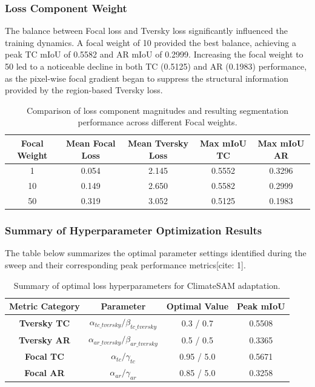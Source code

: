 \subsubsection{Loss Component Weight}
The balance between Focal loss and Tversky loss significantly influenced the training dynamics. A focal weight of 10 provided the best balance, achieving a peak TC mIoU of 0.5582 and AR mIoU of 0.2999. Increasing the focal weight to 50 led to a noticeable decline in both TC (0.5125) and AR (0.1983) performance, as the pixel-wise focal gradient began to suppress the structural information provided by the region-based Tversky loss.

\begin{table}[h]
\centering
\begin{tabular}{@{}ccccc@{}}
\toprule
Focal Weight & Mean Focal Loss & Mean Tversky Loss & Max mIoU TC & Max mIoU AR \\ \midrule
1 & 0.054 & 2.145 & 0.5552 & 0.3296 \\
10 & 0.149 & 2.650 & 0.5582 & 0.2999 \\
50 & 0.319 & 3.052 & 0.5125 & 0.1983 \\ \bottomrule
\end{tabular}
\caption{Comparison of loss component magnitudes and resulting segmentation performance across different Focal weights.}
\end{table}


\subsubsection{Summary of Hyperparameter Optimization Results}

The table below summarizes the optimal parameter settings identified during the sweep and their corresponding peak performance metrics[cite: 1].

\begin{table}[h]
\centering
\begin{tabular}{@{}cccc@{}}
\toprule
Metric Category & Parameter & Optimal Value & Peak mIoU \\ \midrule
\textbf{Tversky TC} & $\alpha_{tc\_tversky} / \beta_{tc\_tversky}$ & 0.3 / 0.7 & 0.5508 \\
\textbf{Tversky AR} & $\alpha_{ar\_tversky} / \beta_{ar\_tversky}$ & 0.5 / 0.5 & 0.3365 \\
\textbf{Focal TC} & $\alpha_{tc} / \gamma_{tc}$ & 0.95 / 5.0 & 0.5671 \\
\textbf{Focal AR} & $\alpha_{ar} / \gamma_{ar}$ & 0.85 / 5.0 & 0.3258 \\ \bottomrule
\end{tabular}
\caption{Summary of optimal loss hyperparameters for ClimateSAM adaptation.}
\end{table}


